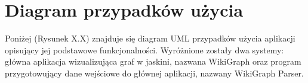 \section{Diagram przypadków użycia}
Poniżej (Rysunek X.X) znajduje się diagram UML przypadków użycia aplikacji opisujący jej podstawowe funkcjonalności. Wyróżnione zostały dwa systemy: główna aplikacja wizualizująca graf w jaskini, nazwana WikiGraph oraz program przygotowujący dane wejściowe do głównej aplikacji, nazwany WikiGraph Parser.

